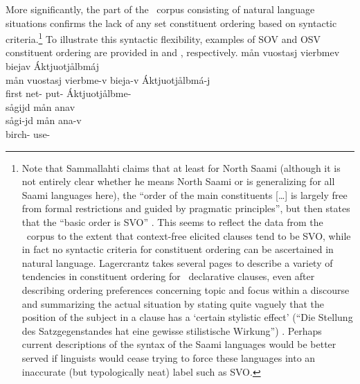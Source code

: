 More significantly, the part of the \PS\ corpus consisting of natural language situations confirms the lack of any set constituent ordering based on syntactic criteria.\footnote{Note that Sammallahti claims that at least for North Saami (although it is not entirely clear whether he means North Saami or is generalizing for all Saami languages here), the “order of the main constituents […] is largely free from formal restrictions and guided by pragmatic principles”, but then states that the “basic order is SVO” \citep[95]{Sammallahti1998}. This seems to reflect the data from the \PS\ corpus to the extent that context-free elicited clauses tend to be SVO, while in fact no syntactic criteria for constituent ordering can be ascertained in natural language. 
Lagercrantz takes several pages to describe a variety of tendencies in constituent ordering for \PS\ declarative clauses, even after describing ordering preferences concerning topic and focus within a discourse and summarizing the actual situation by stating quite vaguely that the position of the subject in a clause has a ‘certain stylistic effect’ (“Die Stellung des Satzgegenstandes hat eine gewisse stilistische Wirkung”) \citep[46]{Lagercrantz1926}. %
Perhaps current descriptions of the syntax of the Saami languages would be better served if linguists %
would cease trying to force these languages into an inaccurate (but typologically neat) label such as SVO.} 
To illustrate this syntactic flexibility, examples of SOV and OSV %
constituent ordering are provided in  and , %
respectively.
\ea\label{deviantConstituentOrder1}
\glll	mån vuostasj vierbmev biejav Áktjuotjålbmáj \\
	mån vuostasj vierbme-v bieja-v Áktjuotjålbmá-j \\
	 first net- put- Áktjuotjålbme-\\\nopagebreak
{} 
\z
\ea\label{deviantConstituentOrder2}%
\glll	sågijd mån anav\\
	sågi-jd mån ana-v\\
	birch-  use- \\\nopagebreak
{} 
\z

